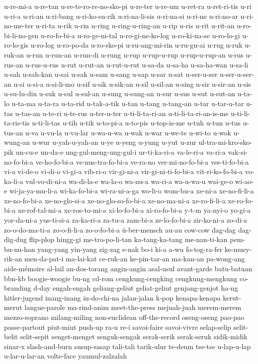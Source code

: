 {u-re-mi-a u-re-tan u-re-te-ro-re-no-sko-pi u-re-ter u-re-um u-ret-ra
u-ret-ri-tis u-ri u-ri-a u-ri-an u-ri-bang u-ri-ko-su-rik u-ri-na-li-sis
u-ri-na-si u-ri-ne u-ri-no-ar u-ri-no-me-ter u-ri-ta u-rik u-rin u-ring
u-ring-u-ring-an u-rip u-ris u-rit u-rit-an u-ro-bi-li-no-gen u-ro-fo-bi-a
u-ro-ge-ni-tal u-ro-gi-ne-ko-log u-ro-ki-na-se u-ro-lo-gi u-ro-lo-gis
u-ro-log u-ro-po-da u-ro-sko-pi u-ru-ang-mi-rin u-ru-gu-ai u-rug u-ruk
u-ruk-an u-run u-run-an u-run-di u-rung u-rup u-rup-u-rup u-rup-u-rup-an
u-rus u-rus-an u-rus-u-rus u-rut u-rut-an u-rut-u-rut u-sa-da u-sa-ha
u-sa-ha-wan u-sa-li u-sah u-sah-kan u-sai u-sak u-sam u-sang u-sap u-sar
u-sat u-ser-u-ser u-ser-u-ser-an u-si u-si-a u-si-li-mo u-sif u-sik
u-sik-an u-sil u-sil-an u-sing u-sir u-sir-an u-sis u-su-lu-din u-suk
u-sul u-sul-an u-sung u-sung-an u-sur u-sus u-sut u-sut-an u-ta-lo u-ta-ma
u-ta-ra u-ta-rid u-tak-a-tik u-tan u-tang u-tang-an u-tar u-tar-u-tar
u-tas u-tas-an u-te-ri u-te-rus u-ter-u-ter u-ti-li-ta-ri-an
u-ti-li-ta-ri-an-is-me u-ti-li-ta-ris-tis u-ti-li-tas u-tih u-tik
u-to-pi-a u-to-pis u-top-is-me u-tuh u-tun u-tus u-tus-an u-va u-vu-la
u-vu-lar u-wa-u-wa u-wak u-war u-we-te u-wi-to u-wok u-wung-an u-wur
u-yah-u-yah-an u-ye u-yeng u-yung u-yut u-zur ul-tra-mi-kro-sko-pik
un-cu-e un-da-e ung-gul-meng-ung-gul-i ur-ti-ka-ri-a va-le-ri-a va-ri-a
vak-si-no-fo-bi-a ve-ho-fo-bi-a ve-nus-tra-fo-bi-a ve-ra-no
ver-mi-no-fo-bi-a ves-ti-fo-bi-a vi-a vi-de-o vi-di-o vi-gi-a vib-ri-o
vir-gi-ni-a vir-gi-ni-ti-fo-bi-a vit-ri-ko-fo-bi-a vo-ka-li-a
vul-vo-di-ni-a wa-di-la-e wa-la-o wa-nu-a wa-ri-a wa-u-wa-u wai-ge-o
wi-ao-e wi-ja-ya-mu-li-a wi-ka-fo-bi-a wi-ra-ni-a-ga wo-li-o wom-bu-a
xe-ni-a xe-no-fi-li-a xe-no-fo-bi-a xe-no-glo-si-a xe-no-glo-so-fo-bi-a
xe-no-ma-ni-a xe-ro-fi-li-a xe-ro-fo-bi-a xe-rof-tal-mi-a xe-ros-to-mi-a
xi-lo-fo-bi-a xi-ro-fo-bi-a y-t-m ya-nyi-o yo-gi-a yor-da-ni-a yus-ti-si-a
za-ka-ri-a za-tu-a zam-bi-a ze-lo-fo-bi-a zir-ko-ni-a zo-di-a
zo-o-do-ma-ti-a zo-o-fi-li-a zo-o-fo-bi-a ü-ber-mensch au-au cow-cow
dag-dag dag-dig-dug flip-plop hingg-gi me-tro-po-li-tan ka-tang-ka-tang
me-nan-ti-kan pem-bu-nu-han yang-yang yin-yang zig-zag e-nak bo-i ki-a
a-wu fo-tog-ra-fer ke-musy-rik-an men-da-pat-i ma-lai-kat ce-ruk-an
ke-pin-tar-an ma-kan-an pa-wong-ang aide-mémoire al-lail an-dos-torang
angin-angin asal-usul avant-garde batu-batuan bbn-kb boogie-woogie bu-ng
cd-rom cengkung-cengking cengkung-mengkung co-branding d-day engah-engah
geliang-geliut geliat-geliut genjang-genjot ha-ng hitler-jugend
inang-inang in-do-chi-na jalan-jalan k-pop kenapa-kenapa kerut-merut
langue-parole ma-rind-anim meet-the-press mejuah-juah merem-merem
mezzo-soprano milang-miling non-euclidean off-the-record oseng-oseng
pao-pao passe-partout piut-miut push-up ra-u re-i savoi-faire savoi-vivre
selap-selip selit-belit selit-sepit senget-menget senguk-sengak
serak-serik serak-seruk sidik-midik sinar-x slash-and-burn susup-sasap
tali-tali tarik-ulur te-deum tse-tse u-lap-u-lap u-lar-u-lar-an volte-face
yaumul-zalzalah
}
